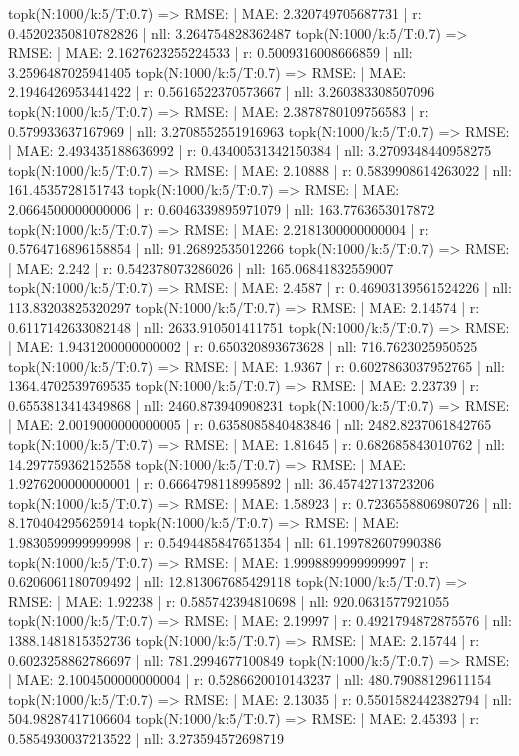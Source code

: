 topk(N:1000/k:5/T:0.7) => RMSE: | MAE: 2.320749705687731 | r: 0.45202350810782826 | nll: 3.264754828362487
topk(N:1000/k:5/T:0.7) => RMSE: | MAE: 2.1627623255224533 | r: 0.5009316008666859 | nll: 3.2596487025941405
topk(N:1000/k:5/T:0.7) => RMSE: | MAE: 2.1946426953441422 | r: 0.5616522370573667 | nll: 3.260383308507096
topk(N:1000/k:5/T:0.7) => RMSE: | MAE: 2.3878780109756583 | r: 0.579933637167969 | nll: 3.2708552551916963
topk(N:1000/k:5/T:0.7) => RMSE: | MAE: 2.493435188636992 | r: 0.43400531342150384 | nll: 3.2709348440958275
topk(N:1000/k:5/T:0.7) => RMSE: | MAE: 2.10888 | r: 0.5839908614263022 | nll: 161.4535728151743
topk(N:1000/k:5/T:0.7) => RMSE: | MAE: 2.0664500000000006 | r: 0.6046339895971079 | nll: 163.7763653017872
topk(N:1000/k:5/T:0.7) => RMSE: | MAE: 2.2181300000000004 | r: 0.5764716896158854 | nll: 91.26892535012266
topk(N:1000/k:5/T:0.7) => RMSE: | MAE: 2.242 | r: 0.542378073286026 | nll: 165.06841832559007
topk(N:1000/k:5/T:0.7) => RMSE: | MAE: 2.4587 | r: 0.46903139561524226 | nll: 113.83203825320297
topk(N:1000/k:5/T:0.7) => RMSE: | MAE: 2.14574 | r: 0.6117142633082148 | nll: 2633.910501411751
topk(N:1000/k:5/T:0.7) => RMSE: | MAE: 1.9431200000000002 | r: 0.650320893673628 | nll: 716.7623025950525
topk(N:1000/k:5/T:0.7) => RMSE: | MAE: 1.9367 | r: 0.6027863037952765 | nll: 1364.4702539769535
topk(N:1000/k:5/T:0.7) => RMSE: | MAE: 2.23739 | r: 0.6553813414349868 | nll: 2460.873940908231
topk(N:1000/k:5/T:0.7) => RMSE: | MAE: 2.0019000000000005 | r: 0.6358085840483846 | nll: 2482.8237061842765
topk(N:1000/k:5/T:0.7) => RMSE: | MAE: 1.81645 | r: 0.682685843010762 | nll: 14.297759362152558
topk(N:1000/k:5/T:0.7) => RMSE: | MAE: 1.9276200000000001 | r: 0.6664798118995892 | nll: 36.45742713723206
topk(N:1000/k:5/T:0.7) => RMSE: | MAE: 1.58923 | r: 0.7236558806980726 | nll: 8.170404295625914
topk(N:1000/k:5/T:0.7) => RMSE: | MAE: 1.9830599999999998 | r: 0.5494485847651354 | nll: 61.199782607990386
topk(N:1000/k:5/T:0.7) => RMSE: | MAE: 1.9998899999999997 | r: 0.6206061180709492 | nll: 12.813067685429118
topk(N:1000/k:5/T:0.7) => RMSE: | MAE: 1.92238 | r: 0.585742394810698 | nll: 920.0631577921055
topk(N:1000/k:5/T:0.7) => RMSE: | MAE: 2.19997 | r: 0.4921794872875576 | nll: 1388.1481815352736
topk(N:1000/k:5/T:0.7) => RMSE: | MAE: 2.15744 | r: 0.6023258862786697 | nll: 781.2994677100849
topk(N:1000/k:5/T:0.7) => RMSE: | MAE: 2.1004500000000004 | r: 0.5286620010143237 | nll: 480.79088129611154
topk(N:1000/k:5/T:0.7) => RMSE: | MAE: 2.13035 | r: 0.5501582442382794 | nll: 504.98287417106604
topk(N:1000/k:5/T:0.7) => RMSE: | MAE: 2.45393 | r: 0.5854930037213522 | nll: 3.273594572698719
